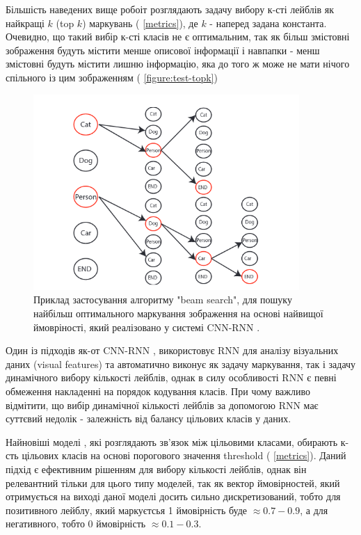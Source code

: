 \documentclass{udstu}
\begin{document}
Більшість наведених вище робоіт розглядають задачу вибору к-сті лейблів як найкращі $k$ (top $k$) маркувань (\chaptername{ \ref{metrics}}),
де $k$ - наперед задана константа. Очевидно, що такий вибір к-сті класів не є оптимальним,
так як більш змістовні зображення будуть містити менше описової інформації і навпапки - менш змістовні будуть
містити лишню інформацію, яка до того ж може не мати нічого спільного із цим зображенням (\figurename{ \ref{figure:test-topk}})

\begin{figure}[!ht]
	\centering
	\includegraphics[width=0.9\textwidth]{PNG/cnn-rnn-lqp}
	\caption{
	Приклад застосування алгоритму "beam search", для
	пошуку найбільш оптимального маркування зображення
	на основі найвищої ймовріності, який
	реалізовано у системі CNN-RNN \cite{cnn-rnn}.
	}
	\label{figure:cnn-rnn-lqp}
\end{figure}

Один із підходів як-от CNN-RNN \cite{cnn-rnn},
використовує RNN для аналізу візуальних даних (visual features) та автоматично виконує як задачу маркування,
так і задачу динамічного вибору кількості лейблів, однак в силу особливості RNN є певні обмеження
накладенні на порядок кодування класів. При чому важливо відмітити, що вибір динамічної кількості лейблів
за допомогою RNN має суттєвий недолік - залежність від балансу цільових класів у даних.

Найновіші моделі \cite{q2l, cpsd, cma}, які розглядають зв'язок між цільовими класами, обирають
к-сть цільових класів на основі порогового значення threshold (\chaptername{ \ref{metrics}}).
Даний підхід є ефективним рішенням для вибору кількості лейблів, однак він релевантний
тільки для цього типу моделей, так як вектор ймовірностей, який отримується на виході
даної моделі досить сильно дискретизований, тобто для позитивного лейблу,
який маркуєтсья 1 ймовірність буде $\approx 0.7-0.9$,
а для негативного, тобто 0 ймовірність $\approx 0.1-0.3$.
\end{document}
